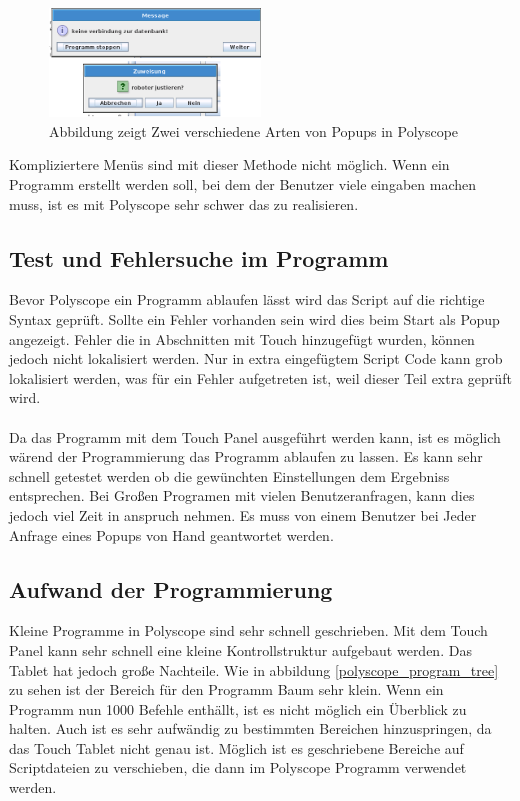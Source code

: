 \begin{figure}[ht]
  \centering
    \includegraphics[width=0.5\textwidth]{pic/popup_question.png}
      \caption[Popup in Polyscipe]{Abbildung zeigt Zwei verschiedene Arten von Popups in Polyscope}
      \label{fig:polyscope_popup}
\end{figure}

Kompliziertere Menüs sind mit dieser Methode nicht möglich. Wenn ein Programm erstellt werden soll, bei dem der Benutzer viele eingaben machen muss, ist es mit Polyscope sehr schwer das zu realisieren.

\subsection{Test und Fehlersuche im Programm}
\label{debuggin_polyscope_rel}

Bevor Polyscope ein Programm ablaufen lässt wird das Script auf die richtige Syntax geprüft. Sollte ein Fehler vorhanden sein wird dies beim Start als Popup angezeigt. Fehler die in Abschnitten mit Touch hinzugefügt wurden, können jedoch nicht lokalisiert werden. Nur in extra eingefügtem Script Code kann grob lokalisiert werden, was für ein Fehler aufgetreten ist, weil dieser Teil extra geprüft wird.
\\\\
Da das Programm mit dem Touch Panel ausgeführt werden kann, ist es möglich wärend der Programmierung das Programm ablaufen zu lassen. Es kann sehr schnell getestet werden ob die gewünchten Einstellungen dem Ergebniss entsprechen. Bei Großen Programen mit vielen Benutzeranfragen, kann dies jedoch viel Zeit in anspruch nehmen. Es muss von einem Benutzer bei Jeder Anfrage eines Popups von Hand geantwortet werden.

\subsection{Aufwand der Programmierung}
\label{polyscope_aufwand}

Kleine Programme in Polyscope sind sehr schnell geschrieben. Mit dem Touch Panel kann sehr schnell eine kleine Kontrollstruktur aufgebaut werden. Das Tablet hat jedoch große Nachteile. Wie in abbildung \ref{polyscope_program_tree} zu sehen ist der Bereich für den Programm Baum sehr klein. Wenn ein Programm nun 1000 Befehle enthällt, ist es nicht möglich ein Überblick zu halten. Auch ist es sehr aufwändig zu bestimmten Bereichen hinzuspringen, da das Touch Tablet nicht genau ist. Möglich ist es geschriebene Bereiche auf Scriptdateien zu verschieben, die dann im Polyscope Programm verwendet werden. 

